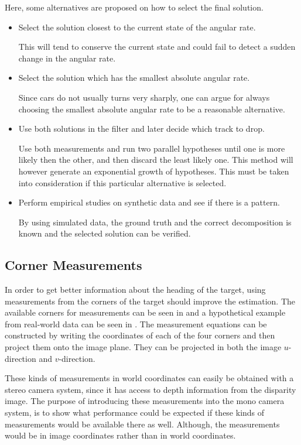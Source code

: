 Here, some alternatives are proposed on how to select the final solution.
%
\begin{itemize}
    \item Select the solution closest to the current state of the angular rate.

    This will tend to conserve the current state and could fail to detect a sudden change in the angular rate.

    \item Select the solution which has the smallest absolute angular rate.

    Since cars do not usually turns very sharply, one can argue for always choosing the smallest absolute angular rate to be a reasonable alternative.

    \item Use both solutions in the filter and later decide which track to drop.

    Use both measurements and run two parallel hypotheses until one is more likely then the other, and then discard the least likely one.
    This method will however generate an exponential growth of hypotheses.
    This must be taken into consideration if this particular alternative is selected.

    \item Perform empirical studies on synthetic data and see if there is a pattern.

    By using simulated data, the ground truth and the correct decomposition is known and the selected solution can be verified.
\end{itemize}

\subsection{Corner Measurements}
In order to get better information about the heading of the target, using measurements from the corners of the target should improve the estimation.
The available corners for measurements can be seen in  and a hypothetical example from real-world data can be seen in .
The measurement equations can be constructed by writing the  coordinates of each of the four corners and then project them onto the image plane.
They can be projected in both the image $u$-direction and $v$-direction.

These kinds of measurements in world coordinates can easily be obtained with a stereo camera system, since it has access to depth information from the disparity image.
The purpose of introducing these measurements into the mono camera system, is to show what performance could be expected if these kinds of measurements would be available there as well.
Although, the measurements would be in image coordinates rather than in world coordinates.

